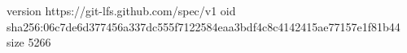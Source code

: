 version https://git-lfs.github.com/spec/v1
oid sha256:06c7de6d377456a337dc555f7122584eaa3bdf4c8c4142415ae77157e1f81b44
size 5266
